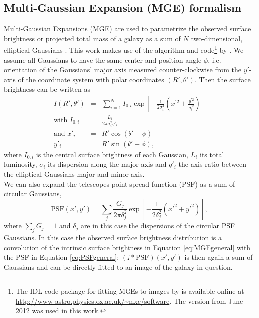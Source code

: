 \subsection{Multi-Gaussian Expansion (MGE) formalism} \label{sec:MGE_theo}

Multi-Gaussian Expansions (MGE) are used to parametrize the observed surface brightness or projected total mass of a galaxy as a sum of $N$ two-dimensional, elliptical Gaussians \citep{1991ApJ...366..599B,1992A&A...253..366M,1994A&A...285..723E,1999MNRAS.303..495E}. This work makes use of the algorithm and code\footnote{The IDL code package for fitting MGEs to images by \citet{Cap02} is available online at \url{http://www-astro.physics.ox.ac.uk/~mxc/software}. The version from June 2012 was used in this work.} by \citet{Cap02}. We assume all Gaussians to have the same center and position angle $\phi$, i.e. orientation of the Gaussians' major axis measured counter-clockwise from the $y'$-axis of the coordinate system with polar coordinates $(R',\theta')$. Then the surface brightness can be written as
\begin{eqnarray}
I(R',\theta') &=& \sum_{i=1}^{N} I_{0,i} \exp\left[ - \frac{1}{2\sigma_i^2} \left(x^{'2} + \frac{y^{'2}}{q_i^{'2}}\right)\right]\label{eq:MGEgeneral}\\
\text{with } I_{0,i} &=& \frac{L_i}{2\pi \sigma_i^2 q'_i}\label{eq:centralItotalL}\\
\text{and } x'_i &=& R' \cos(\theta' - \phi)\nonumber\\
y'_i &=& R' \sin(\theta' - \phi),\nonumber
\end{eqnarray}
where $I_{0,i}$ is the central surface brightness of each Gaussian, $L_i$ its total luminosity, $\sigma_i$ its dispersion along the major axis and $q'_i$ the axis ratio between the elliptical Gaussians major and minor axis.
\\We can also expand the telescopes point-spread function (PSF) as a sum of circular Gaussians,
\begin{equation}
\text{PSF}(x',y') = \sum_j \frac{G_j}{2 \pi \delta_j^2} \exp\left[- \frac{1}{2 \delta_j^2} \left({x'}^2 + {y'}^2 \right)\right], \label{eq:PSFgeneral}
\end{equation}
where $\sum_j G_j = 1$ and $\delta_j$ are in this case the dispersions of the circular PSF Gaussians. In this case the observed surface brightness distribution is a convolution of the intrinsic surface brightness in Equation \ref{eq:MGEgeneral} with the PSF in Equation \ref{eq:PSFgeneral}: $(I \ast \text{PSF}) (x',y')$ is then again a sum of Gaussians and can be directly fitted to an image of the galaxy in question.

